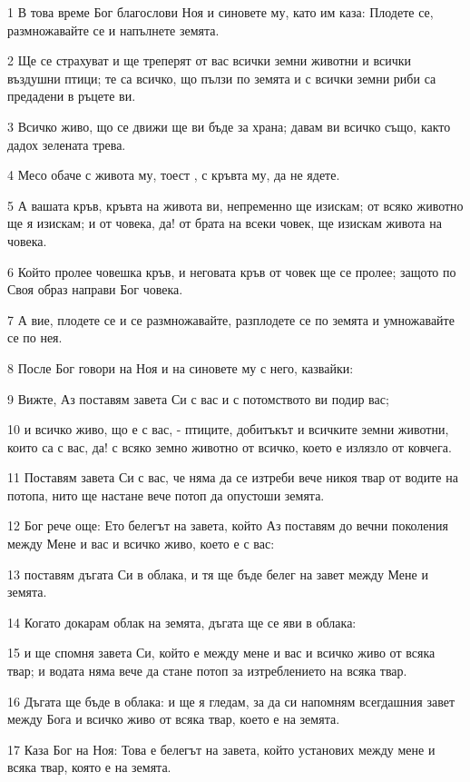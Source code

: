 \par 1 В това време Бог благослови Ноя и синовете му, като им каза: Плодете се, размножавайте се и напълнете земята.
\par 2 Ще се страхуват и ще треперят от вас всички земни животни и всички въздушни птици; те са всичко, що пълзи по земята и с всички земни риби са предадени в ръцете ви.
\par 3 Всичко живо, що се движи ще ви бъде за храна; давам ви всичко също, както дадох зелената трева.
\par 4 Месо обаче с живота му, тоест , с кръвта му, да не ядете.
\par 5 А вашата кръв, кръвта на живота ви, непременно ще изискам; от всяко животно ще я изискам; и от човека, да! от брата на всеки човек, ще изискам живота на човека.
\par 6 Който пролее човешка кръв, и неговата кръв от човек ще се пролее; защото по Своя образ направи Бог човека.
\par 7 А вие, плодете се и се размножавайте, разплодете се по земята и умножавайте се по нея.
\par 8 После Бог говори на Ноя и на синовете му с него, казвайки:
\par 9 Вижте, Аз поставям завета Си с вас и с потомството ви подир вас;
\par 10 и всичко живо, що е с вас, - птиците, добитъкът и всичките земни животни, които са с вас, да! с всяко земно животно от всичко, което е излязло от ковчега.
\par 11 Поставям завета Си с вас, че няма да се изтреби вече никоя твар от водите на потопа, нито ще настане вече потоп да опустоши земята.
\par 12 Бог рече още: Ето белегът на завета, който Аз поставям до вечни поколения между Мене и вас и всичко живо, което е с вас:
\par 13 поставям дъгата Си в облака, и тя ще бъде белег на завет между Мене и земята.
\par 14 Когато докарам облак на земята, дъгата ще се яви в облака:
\par 15 и ще спомня завета Си, който е между мене и вас и всичко живо от всяка твар; и водата няма вече да стане потоп за изтреблението на всяка твар.
\par 16 Дъгата ще бъде в облака: и ще я гледам, за да си напомням всегдашния завет между Бога и всичко живо от всяка твар, което е на земята.
\par 17 Каза Бог на Ноя: Това е белегът на завета, който установих между мене и всяка твар, която е на земята.
